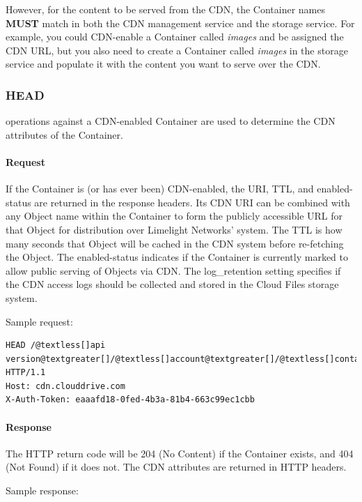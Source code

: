 \documentclass[letterpaper,10pt,english]{manual}
\begin{document}
However, for the content to be served from the CDN, the Container names
\textbf{MUST} match in both the CDN management service and the storage service.
For example, you could CDN-enable a Container called \emph{images} and be
assigned the CDN URL, but you also need to create a Container called
\emph{images} in the storage service and populate it with the content you
want to serve over the CDN.


\subsubsection{HEAD}

 operations against a CDN-enabled Container are used to determine
the CDN attributes of the Container.


\paragraph{Request}

If the Container is (or has ever been) CDN-enabled, the URI, TTL, and
enabled-status are returned in the response headers.  Its CDN URI can
be combined with any Object name within the Container to form the
publicly accessible URL for that Object for distribution over Limelight
Networks' system.  The TTL is how many seconds that Object will be
cached in the CDN system before re-fetching the Object.  The
enabled-status indicates if the Container is currently marked to allow
public serving of Objects via CDN.  The log\_retention setting
specifies if the CDN access logs should be collected and stored in
the Cloud Files storage system.

Sample request:

\begin{Verbatim}[commandchars=@\[\]]
HEAD /@textless[]api version@textgreater[]/@textless[]account@textgreater[]/@textless[]container@textgreater[] HTTP/1.1
Host: cdn.clouddrive.com
X-Auth-Token: eaaafd18-0fed-4b3a-81b4-663c99ec1cbb
\end{Verbatim}


\paragraph{Response}

The HTTP return code will be 204 (No Content) if the Container exists,
and 404 (Not Found) if it does not. The CDN attributes are returned in
HTTP headers.

Sample response:
\end{document}
